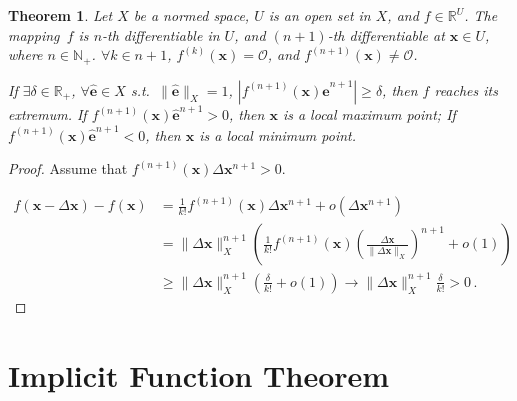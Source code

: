 \documentclass[openany]{book}
\theoremstyle{plain}
\newtheorem{theorem}{Theorem}[section] %
\theoremstyle{definition}
\newcommand*{\basis}[1]{\hat{\boldsymbol{#1}}} %
\newcommand*{\bv}{\boldsymbol} %
\begin{document}
\begin{theorem}
	Let $X$ be a normed space, $U$ is an open set in $X$, and $f \in \mathbb R^U$.
	The mapping~$f$ is $n$-th differentiable in $U$, and $(n + 1)$-th differentiable at $\bv x \in U$, where $n \in \mathbb N_+$.
	$\forall k \in n + 1$, $f^{(k)}(\bv x) = \mathscr O$, and $f^{(n + 1)}(\bv x) \neq \mathscr O$.

	If $\exists \delta \in \mathbb R_+$, $\forall \basis e \in X$ s.t.\ $\|\basis e\|_X = 1$, $|f^{(n + 1)}(\bv x) \basis e^{n+1}| \geq \delta$, then $f$ reaches its extremum.
	If $f^{(n + 1)}(\bv x) \basis e^{n+1} > 0$, then $\bv x$ is a local maximum point; 
	If $f^{(n + 1)}(\bv x) \basis e^{n+1} < 0$, then $\bv x$ is a local minimum point. 
\end{theorem}
\begin{proof}
	Assume that $f^{(n + 1)}(\bv x) \Delta \bv x^{n+1} > 0$.
	
	\begin{align*}
		f(\bv x - \Delta \bv x) - f(\bv x)
		&= \frac{1}{k!} f^{(n + 1)}(\bv x) \Delta \bv x^{n+1} + o(\Delta \bv x^{n+1})
		\\
		&= \|\Delta \bv x\|_X^{n+1} \left( 
			\frac{1}{k!} f^{(n + 1)}(\bv x) \left(\frac{\Delta \bv x}{\|\Delta \bv x\|_X}\right)^{n+1} + o(1)
		 \right)
		\\
		&\geq
		\|\Delta \bv x\|_X^{n+1} \left( 
			\frac{\delta}{k!}  + o(1)
		 \right) \to \|\Delta \bv x\|_X^{n+1} \frac{\delta}{k!} > 0\,.
	\end{align*}	
\end{proof}

\section{Implicit Function Theorem}
\end{document}
